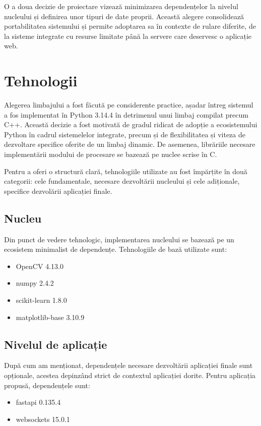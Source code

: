 O a doua decizie de proiectare vizează minimizarea dependențelor la nivelul nucleului și definirea unor tipuri de date proprii. Această alegere consolidează portabilitatea sistemului și permite adoptarea sa în contexte de rulare diferite, de la sisteme integrate cu resurse limitate până la servere care deservesc o aplicație web.

\section{Tehnologii}
\indent\par
Alegerea limbajului a fost făcută pe considerente practice, așadar întreg sistemul a fos implementat în Python 3.14.4 în detrimenul unui limbaj compilat precum C++. Această decizie a fost motivată de gradul ridicat de adopție a ecosistemului Python în cadrul sistemelelor integrate, precum și de flexibilitatea și viteza de dezvoltare specifice oferite de un limbaj dinamic. De asemenea, librăriile necesare implementării modului de procesare se bazează pe nuclee scrise în C.

Pentru a oferi o structură clară, tehnologiile utilizate au fost împărțite în două categorii: cele fundamentale, necesare dezvoltării nucleului și cele adiționale, specifice dezvolării aplicației finale.

\subsection{Nucleu}
\indent\par
Din punct de vedere tehnologic, implementarea nucleului se bazează pe un ecosistem minimalist de dependențe. Tehnologiile de bază utilizate sunt:
\begin{itemize}
  \item{OpenCV 4.13.0}
  \item{numpy 2.4.2}
  \item{scikit-learn 1.8.0}
  \item{matplotlib-base 3.10.9}
\end{itemize}

\subsection{Nivelul de aplicație}
\indent\par
După cum am menționat, dependențele necesare dezvoltării aplicației finale sunt opționale, acestea depinzând strict de contextul aplicației dorite. Pentru aplicația propusă, dependențele sunt:
\begin{itemize}
  \item{fastapi 0.135.4}
  \item{websockets 15.0.1}
\end{itemize}


